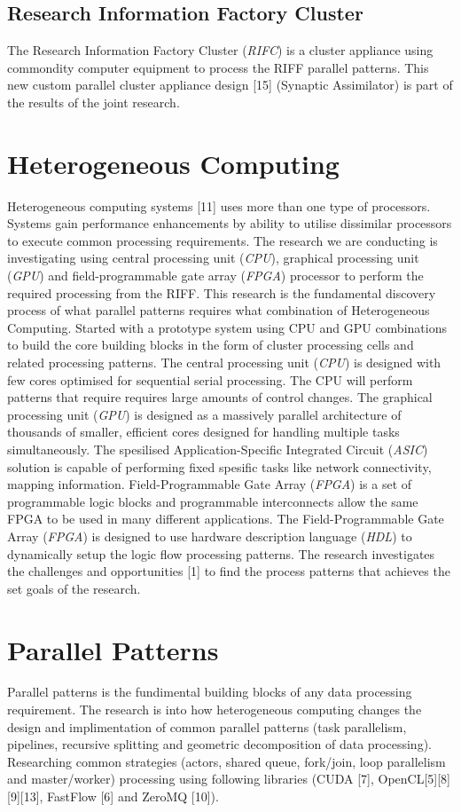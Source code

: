 \documentclass{acm_proc_article-sp}
\begin{document}
\subsection{Research Information Factory Cluster}
The Research Information Factory Cluster (\textit{RIFC}) is a cluster appliance using commondity computer equipment to process the RIFF parallel patterns. This new custom parallel cluster appliance design [15] (Synaptic Assimilator) is part of the results of the joint research.
\section{Heterogeneous Computing}
Heterogeneous computing systems [11] uses more than one type of processors. Systems gain performance enhancements by ability to utilise dissimilar processors to execute common processing requirements. The research we are conducting is investigating using central processing unit (\textit{CPU}), graphical processing unit (\textit{GPU}) and field-programmable gate array (\textit{FPGA}) processor to perform the required processing from the RIFF. This research is the fundamental discovery process of what parallel patterns requires what combination of Heterogeneous Computing. Started with a prototype system using CPU and GPU combinations to build the core building blocks in the form of cluster processing cells and related processing patterns. The central processing unit (\textit{CPU}) is designed with few cores optimised for sequential serial processing. The CPU will perform patterns that require requires large amounts of control changes. The graphical processing unit (\textit{GPU}) is designed as a massively parallel architecture of thousands of smaller, efficient cores designed for handling multiple tasks simultaneously. The spesilised Application-Specific Integrated Circuit (\textit{ASIC}) solution is capable of performing fixed spesific tasks like network connectivity, mapping information. Field-Programmable Gate Array (\textit{FPGA}) is a set of programmable logic blocks and programmable interconnects allow the same FPGA to be used in many different applications. The Field-Programmable Gate Array (\textit{FPGA}) is designed to use hardware description language (\textit{HDL}) to dynamically setup the logic flow processing patterns. The research investigates the challenges and opportunities [1] to find the process patterns that achieves the set goals of the research.  
\section{Parallel Patterns}
Parallel patterns is the fundimental building blocks of any data processing requirement. The research is into how heterogeneous computing changes the design and implimentation of common parallel patterns (task parallelism, pipelines, recursive splitting and geometric decomposition of data processing). Researching common strategies (actors, shared queue, fork/join, loop parallelism and master/worker) processing using following libraries (CUDA [7], OpenCL[5][8][9][13], FastFlow [6] and ZeroMQ [10]).
\end{document}

